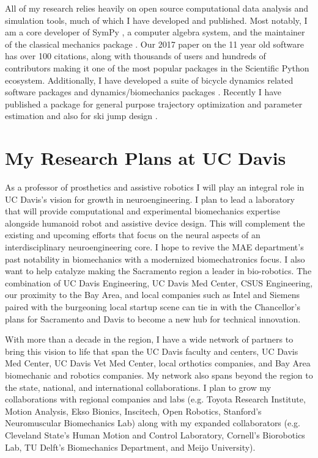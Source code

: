 \documentclass[letter]{article}
\begin{document}
All of my research relies heavily on open source computational data analysis
and simulation tools, much of which I have developed and published. Most
notably, I am a core developer of SymPy \cite{SymPyDevelopmentTeam2006}, a computer
algebra system, and the maintainer of the classical mechanics package
\cite{Gede2013}. Our 2017 paper \cite{Meurer2017} on the 11 year old software has over
100 citations, along with thousands of users and hundreds of contributors
making it one of the most popular packages in the Scientific Python ecosystem.
Additionally, I have developed a suite of bicycle dynamics related software
packages \cite{Moore2010b,Moore2011d,Moore2011a,Moore2011e} and
dynamics/biomechanics packages \cite{Dembia2011,Moore2011,Moore2011b,Moore2013b,Moore2017b,Moore2018a}. Recently I have published a package
for general purpose trajectory optimization and parameter estimation
\cite{Moore2018} and also for ski jump design \cite{Moore2018a}.


\section{My Research Plans at UC Davis%
  \label{my-research-plans-at-uc-davis}%
}

As a professor of prosthetics and assistive robotics I will play an integral
role in UC Davis's vision for growth in neuroengineering. I plan to lead a
laboratory that will provide computational and experimental biomechanics
expertise alongside humanoid robot and assistive device design. This will
complement the existing and upcoming efforts that focus on the neural aspects
of an interdisciplinary neuroengineering core. I hope to revive the MAE
department's past notability in biomechanics with a modernized biomechatronics
focus. I also want to help catalyze making the Sacramento region a leader in
bio-robotics. The combination of UC Davis Engineering, UC Davis Med Center,
CSUS Engineering, our proximity to the Bay Area, and local companies such as
Intel and Siemens paired with the burgeoning local startup scene can tie in
with the Chancellor's plans for Sacramento and Davis to become a new hub for
technical innovation.

With more than a decade in the region, I have a wide network of partners to
bring this vision to life that span the UC Davis faculty and centers, UC Davis
Med Center, UC Davis Vet Med Center, local orthotics companies, and Bay Area
biomechanic and robotics companies. My network also spans beyond the region to
the state, national, and international collaborations. I plan to grow my
collaborations with regional companies and labs (e.g. Toyota Research
Institute, Motion Analysis, Ekso Bionics, Inscitech, Open Robotics, Stanford's
Neuromuscular Biomechanics Lab) along with my expanded collaborators (e.g.
Cleveland State's Human Motion and Control Laboratory, Cornell's Biorobotics
Lab, TU Delft's Biomechanics Department, and Meijo University).
\end{document}
